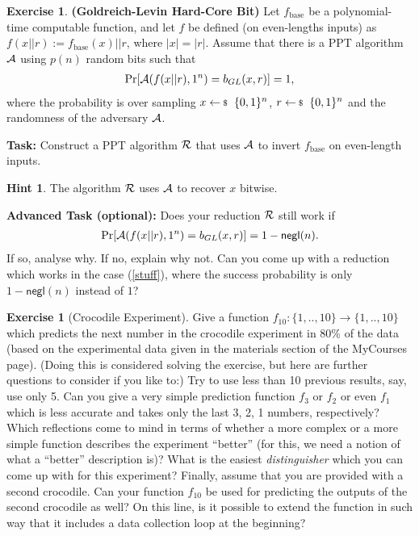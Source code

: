 \documentclass[envcountsame,runningheads,notitlepage]{../llncs}
\theoremstyle{definition}
\newtheorem{graded}[crossed]{Exercise}
\newtheorem*{hint}{Hint}
\begin{document}
\begin{graded}\textbf{(Goldreich-Levin Hard-Core Bit)}
	Let $f_\text{base}$ be a polynomial-time computable function, and let $f$ be defined (on even-lengths inputs) as $f(x||r):=f_\text{base}(x)||r$,
	where $|x|=|r|$.
	Assume that there is a PPT algorithm $\mathcal{A}$ using $p(n)$ random bits such that
	\begin{align}\label{huhu}
	\prob{\adv(f(x||r),1^n)=b_{GL}(x,r)}=1,
	\end{align}
where the probability is over sampling $x\sample\bin^n$, $r\sample\bin^n$ and the randomness of the adversary $\mathcal{A}$. \newline

\noindent
\textbf{Task:}
	Construct a PPT algorithm $\mathcal{R}$ that uses $\mathcal{A}$ to invert $f_\text{base}$ on even-length inputs.
	\begin{hint}
		The algorithm $\mathcal{R}$ uses $\mathcal{A}$ to recover $x$ bitwise.
	\end{hint}
\noindent
\textbf{Advanced Task (optional):} Does your reduction $\mathcal{R}$ still work if 
	\begin{align}\label{stuff}
	\prob{\adv(f(x||r),1^n)=b_{GL}(x,r)}=1-\mathsf{negl}(n).
	\end{align}
If so, analyse why. If no, explain why not. Can you come up with a reduction which works in the
case (\ref{stuff}), where the success probability is only $1-\mathsf{negl}(n)$ instead of $1$?
\end{graded}


\begin{graded}[Crocodile Experiment]
Give a function $f_{10}:\{1,..,10\}\rightarrow\{1,..,10\}$ which predicts the next number in the crocodile experiment
in 80\% of the data (based on the experimental data given in the materials section of the MyCourses page). (Doing this is considered solving the exercise, but here are further
questions to consider if you like to:) Try to use less than 10 previous results, say, use only 5. Can you give a very simple prediction function $f_3$ or $f_2$ or even $f_1$ which is less accurate and takes only the last 3, 2, 1 numbers, respectively? Which reflections come to mind in terms of whether a more complex or a more simple function describes the experiment ``better'' (for this, we need a notion of what a ``better'' description is)? What is the easiest \emph{distinguisher} which you can come up with for this experiment?
Finally, assume that you are provided with a second crocodile. Can your function $f_{10}$ be used for predicting the outputs of the second crocodile as well? On this line, is it possible to extend the function in such way that it includes a data collection loop at the beginning? 
\end{graded}
\end{document}
